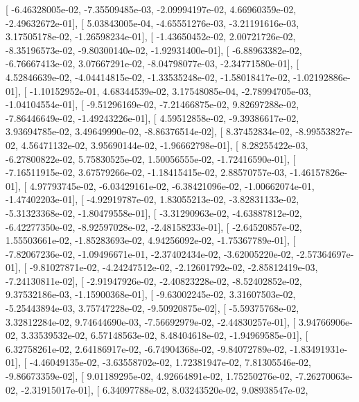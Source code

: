 \documentclass{article}
\begin{document}
       [ -6.46328005e-02,  -7.35509485e-03,  -2.09994197e-02,
          4.66960359e-02,  -2.49632672e-01],
       [  5.03843005e-04,  -4.65551276e-03,  -3.21191616e-03,
          3.17505178e-02,  -1.26598234e-01],
       [ -1.43650452e-02,   2.00721726e-02,  -8.35196573e-02,
         -9.80300140e-02,  -1.92931400e-01],
       [ -6.88963382e-02,  -6.76667413e-02,   3.07667291e-02,
         -8.04798077e-03,  -2.34771580e-01],
       [  4.52846639e-02,  -4.04414815e-02,  -1.33535248e-02,
         -1.58018417e-02,  -1.02192886e-01],
       [ -1.10152952e-01,   4.68344539e-02,   3.17548085e-04,
         -2.78994705e-03,  -1.04104554e-01],
       [ -9.51296169e-02,  -7.21466875e-02,   9.82697288e-02,
         -7.86446649e-02,  -1.49243226e-01],
       [  4.59512858e-02,  -9.39386617e-02,   3.93694785e-02,
          3.49649990e-02,  -8.86376514e-02],
       [  8.37452834e-02,  -8.99553827e-02,   4.56471132e-02,
          3.95690144e-02,  -1.96662798e-01],
       [  8.28255422e-03,  -6.27800822e-02,   5.75830525e-02,
          1.50056555e-02,  -1.72416590e-01],
       [ -7.16511915e-02,   3.67579266e-02,  -1.18415415e-02,
          2.88570757e-03,  -1.46157826e-01],
       [  4.97793745e-02,  -6.03429161e-02,  -6.38421096e-02,
         -1.00662074e-01,  -1.47402203e-01],
       [ -4.92919787e-02,   1.83055213e-02,  -3.82831133e-02,
         -5.31323368e-02,  -1.80479558e-01],
       [ -3.31290963e-02,  -4.63887812e-02,  -6.42277350e-02,
         -8.92597028e-02,  -2.48158233e-01],
       [ -2.64520857e-02,   1.55503661e-02,  -1.85283693e-02,
          4.94256092e-02,  -1.75367789e-01],
       [ -7.82067236e-02,  -1.09496671e-01,  -2.37402434e-02,
         -3.62005220e-02,  -2.57364697e-01],
       [ -9.81027871e-02,  -4.24247512e-02,  -2.12601792e-02,
         -2.85812419e-03,  -7.24130811e-02],
       [ -2.91947926e-02,  -2.40823228e-02,  -8.52402852e-02,
          9.37532186e-03,  -1.15900368e-01],
       [ -9.63002245e-02,   3.31607503e-02,  -5.25443894e-03,
          3.75747228e-02,  -9.50920875e-02],
       [ -5.59375768e-02,   3.32812284e-02,   9.74644690e-03,
         -7.56692979e-02,  -2.44830257e-01],
       [  3.94766906e-02,   3.33539532e-02,   6.57148563e-02,
          8.48404618e-02,  -1.94969585e-01],
       [  6.32758261e-02,   2.64186917e-02,  -6.74904368e-02,
         -9.84072789e-02,  -1.83491931e-01],
       [ -4.46049135e-02,  -3.63558702e-02,   1.72381947e-02,
          7.81305546e-02,  -9.86673359e-02],
       [  9.01189295e-02,   4.92664891e-02,   1.75250276e-02,
         -7.26270063e-02,  -2.31915017e-01],
       [  6.34097788e-02,   8.03243520e-02,   9.08938547e-02,
\end{document}

